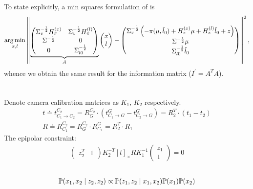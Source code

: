 \documentclass[a4paper]{scrreprt}
\begin{document}
To state explicitly, a min squares formulation of 
 is
\begin{gather}
\operatorname*{arg\,min}_{x,l}
	\left\lVert 
	\underset{A}{\underbrace{
			\begin{pmatrix}
				\Sigma_v^{-\frac{1}{2}}H_\pi^{(x)}  
				& \Sigma_v^{-\frac{1}{2}} H_\pi^{(l)} \\
				\Sigma^{-\frac{1}{2}} & 0 \\
				0 & \Sigma^{-\frac{1}{2}}_{l0}
			\end{pmatrix}
			}}
	\begin{pmatrix}
	x \\ l
	\end{pmatrix}
	- 
	\begin{pmatrix}
		\Sigma_v^{-\frac{1}{2}}\left(-\pi(\mu,\hat{l}_0)+H_\pi^{(x)}\mu + 
		H_\pi^{(l)}\hat{l}_0 + z\right) \\
		\Sigma^{-\frac{1}{2}}\mu \\ \Sigma_{l0}^{-\frac{1}{2}}\hat{l}_0
	\end{pmatrix} \right\rVert^2, 
\end{gather}
whence we obtain the same result for the information matrix ($I^\prime=A^TA$). 

\chapter{}
\section{}
Denote camera calibration matrices as $K_1$, $K_2$ respectively. 
\begin{gather}
	t\doteq t^{C_2}_{C_1\to C_2} = R_G^{C_2}\cdot(t^G_{C_1\to G}-t^G_{C_2\to 
	G}) = R_2^T\cdot(t_1-t_2) \\
	R \doteq R_{C_1}^{C_2} = R_G^{C_2}\cdot R_{C_1}^{G} = R_2^T \cdot R_1
\end{gather}
The epipolar constraint: 
\begin{gather}
	\begin{pmatrix}
		z_2^T  & 1
	\end{pmatrix}
	K_2^{-T} [t]_\times R K_1^{-1} 
	\begin{pmatrix}
		z_1 \\ 1
	\end{pmatrix}
	= 0
\end{gather}

\section{}
\begin{gather}
	\mathbb{P}({x_1, x_2\mid z_2, z_2}) \propto \mathbb{P}({z_1, z_2\mid x_1, x_2}) 
	\mathbb{P}({x_1}) \mathbb{P}({x_2})
\end{gather}
\end{document}
